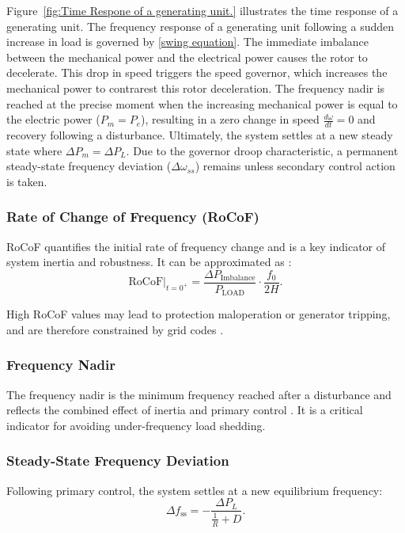 Figure~\ref{fig:Time Respone of a generating unit.} illustrates the time response of a generating unit. The frequency response of a generating unit following a sudden increase in load is governed by \ref{swing equation}. The immediate imbalance between the mechanical power and the electrical power causes the rotor to decelerate. This drop in speed triggers the speed governor, which increases the mechanical power to contrarest this rotor deceleration. The frequency nadir is reached at the precise moment when the increasing mechanical power is equal to the electric power ($P_m = P_ e$), resulting in a zero change in speed $\frac{d\omega}{dt} = 0$ and recovery following a disturbance. Ultimately, the system settles at a new steady state where $\Delta P_m = \Delta P_L$. Due to the governor droop characteristic, a permanent steady-state frequency deviation ($\Delta\omega_{ss}$) remains unless secondary control action is taken.


\subsubsection{Rate of Change of Frequency (RoCoF)}

RoCoF quantifies the initial rate of frequency change and is a key indicator of system inertia and robustness. It can be approximated as \cite{ENTSOE2020_RoCoF}:
\begin{equation}
    \text{RoCoF}\big|_{t=0^+} = 
    \frac{\Delta P_{\mathrm{Imbalance}}}{P_{\mathrm{LOAD}}} \cdot \frac{f_0}{2H}.
\end{equation}

High RoCoF values may lead to protection maloperation or generator tripping, and are therefore constrained by grid codes \cite{ENTSOE2020_RoCoF}.

\subsubsection{Frequency Nadir}

The frequency nadir is the minimum frequency reached after a disturbance and reflects the combined effect of inertia and primary control \cite{kundur1994}. It is a critical indicator for avoiding under-frequency load shedding.

\subsubsection{Steady-State Frequency Deviation}

Following primary control, the system settles at a new equilibrium frequency:
\begin{equation}
    \Delta f_{\mathrm{ss}} = 
    -\frac{\Delta P_L}{\frac{1}{R} + D}.
\end{equation}

